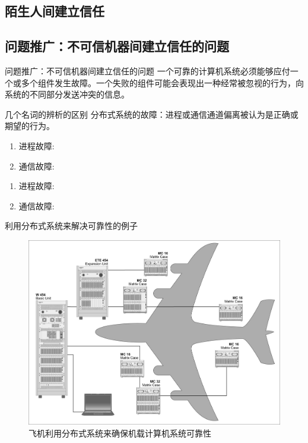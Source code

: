 \documentclass[11pt]{beamer}
\begin{document}
\subsection{陌生人间建立信任}

\subsection{问题推广：不可信机器间建立信任的问题}
\begin{frame}{问题推广：不可信机器间建立信任的问题}
	一个可靠的计算机系统必须能够应付一个或多个组件发生故障。一个失败的组件可能会表现出一种经常被忽视的行为，向系统的不同部分发送冲突的信息。
\end{frame}

\begin{frame}{几个名词的辨析的区别}
	分布式系统的故障：进程或通信通道偏离被认为是正确或期望的行为。
	\begin{enumerate}
		\item 进程故障: 
		\item 通信故障:
		\end{enumerate}
	
	\begin{enumerate}
		\item 进程故障: 
		\item 通信故障:
	\end{enumerate}
\end{frame}

\begin{frame}{利用分布式系统来解决可靠性的例子}
	\begin{figure}
		\centering
		\includegraphics[width=0.7\linewidth]{figures/distributedPlane}
		\caption{飞机利用分布式系统来确保机载计算机系统可靠性}
		\label{fig:distributedplane}
	\end{figure}
	
\end{frame}
\end{document}
